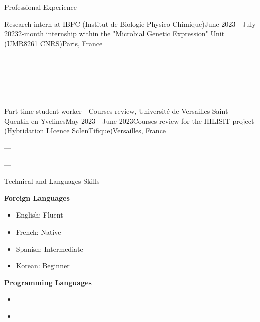 \documentclass[
	10pt,
]{style} %
\begin{document}
\begin{rSection}{Professional Experience}

	\begin{rSubsection}{Research intern at IBPC (Institut de Biologie Physico-Chimique)}{June 2023 - July 2023}{2-month internship within the "Microbial Genetic Expression" Unit (UMR8261 CNRS)}{Paris, France}
		\item ---
		\item ---
		\item ---
	\end{rSubsection}


	\begin{rSubsection}{Part-time student worker - Courses review, Université de Versailles Saint-Quentin-en-Yvelines}{May 2023 - June 2023}{Courses review for the HILISIT project (Hybridation LIcence ScIenTifique)}{Versailles, France}
		\item ---
		\item ---
	\end{rSubsection}

\end{rSection}


\begin{rSection}{Technical and Languages Skills}

	\textbf{Foreign Languages}
	\begin{itemize}
		\item English: Fluent
		\item French: Native
		\item Spanish: Intermediate
		\item Korean: Beginner
	\end{itemize}
	\textbf{Programming Languages}
	\begin{itemize}
		\item ---
		\item ---
	\end{itemize}

\end{rSection}

\end{document}
